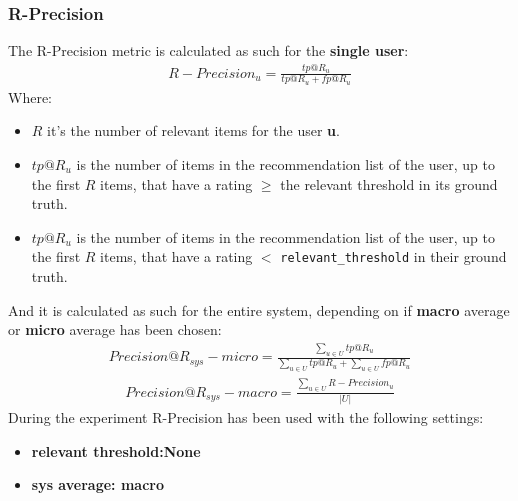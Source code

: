 \documentclass[11pt]{article}
\begin{document}
\subsubsection{R-Precision}\label{subsubsec:r-prec}
The R-Precision metric is calculated as such for the \textbf{single user}:
\hfill\break
\hfill\break
    \[
       \begin{gathered}
           R-Precision_u = \frac{tp@R_u}{tp@R_u + fp@R_u}
       \end{gathered}
    \]
\hfill\break
\hfill\break
    Where:
\begin{itemize}
    \item $R$ it's the number of relevant items for the user \textbf{u}.
    \item $tp@R_u$ is the number of items in the recommendation list of the user, up to the first   $R$ items,
        that have a rating $\geq$ the relevant threshold in its ground truth.
    \item $tp@R_u$ is the number of items in the recommendation list of the user, up to the first $R$ items,
        that have a rating $<$ \texttt{relevant\_threshold} in their ground truth.
\end{itemize}
\hfill\break
\hfill\break
And it is calculated as such for the entire system, depending on if \textbf{macro} average or \textbf{micro} average
has been chosen:
\hfill\break
\hfill\break
    \[
       \begin{gathered}
           Precision@R_{sys} - micro = \frac{\sum_{u \in U} tp@R_u}{\sum_{u \in U} tp@R_u + \sum_{u \in U} fp@R_u}
       \end{gathered}
    \]
\hfill\break
\hfill\break
    \[
       \begin{gathered}
           Precision@R_{sys} - macro = \frac{\sum_{u \in U} R-Precision_u}{|U|}
       \end{gathered}
    \]
\hfill\break
\hfill\break
During the experiment R-Precision has been used with the following settings:
\begin{itemize}
    \item \textbf{relevant threshold:None }
    \item \textbf{sys average: macro }
\end{itemize}
\hfill\break
\hfill\break

\end{document}
